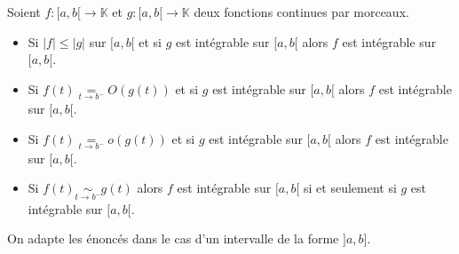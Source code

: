 \documentclass[french,11pt,twoside]{VcCours}
\begin{document}
\begin{Theoreme}{} Soient $f : [a,b[ \rightarrow \mathbb{K}$ et $g : [a,b[ \rightarrow \mathbb{K}$ deux fonctions continues par morceaux.

\begin{itemize}
\item Si $\vert f \vert \leq \vert g \vert$ sur $[a,b[$ et si $g$ est intégrable sur $[a,b[$ alors $f$ est intégrable sur $[a,b[$.
\item Si $f(t) \underset{ t \rightarrow b^{-}}{=} O(g(t))  $ et si $g$ est intégrable sur $[a,b[$ alors $f$ est intégrable sur $[a,b[$.
\item Si $f(t) \underset{ t \rightarrow b^{-}}{=} o(g(t))  $ et si $g$ est intégrable sur $[a,b[$ alors $f$ est intégrable sur $[a,b[$.
\item Si $f(t) \underset{ t \rightarrow b^{-}}{\sim}g(t)$ alors $f$ est intégrable sur $[a,b[$ si et seulement si $g$ est intégrable sur $[a,b[$.
\end{itemize}
\end{Theoreme}

\begin{Remarque}{} On adapte les énoncés dans le cas d'un intervalle de la forme $]a,b]$.
\end{Remarque}
\end{document}
